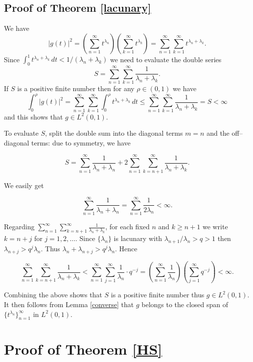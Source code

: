 \documentclass[11pt, a4paper]{article}
\begin{document}
\subsection{Proof of Theorem \ref{lacunary}}



We have
\[
|g(t)|^2=\left(\sum_{n=1}^{\infty} t^{\lambda_n}\right)\left(\sum_{k=1}^{\infty} t^{\lambda_k}\right)=
\sum_{n=1}^{\infty}\sum_{k=1}^{\infty} t^{\lambda_n + \lambda_k}.
\]
Since $\int_{0}^{1} t^{\lambda_n + \lambda_k}\, dt<1/(\lambda_n + \lambda_k)$ we need to evaluate the double series
\[
S=\sum_{n=1}^{\infty}\sum_{k=1}^{\infty}\frac{1}{\lambda_n + \lambda_k}.
\]
If $S$ is a positive finite number then for any $\rho\in (0,1)$ we have
\[
\int_{0}^{\rho}|g(t)|^2=\sum_{n=1}^{\infty}\sum_{k=1}^{\infty}\int_{0}^{\rho}  t^{\lambda_n + \lambda_k} \, dt \le
\sum_{n=1}^{\infty}\sum_{k=1}^{\infty} \frac{1}{\lambda_n + \lambda_k}=S<\infty
\]
and this shows that $g\in L^2 (0,1)$.


To evaluate $S$, split the double sum into the diagonal terms $m=n$ and the off--diagonal terms: due to symmetry, we have

\[
S=\sum_{n=1}^{\infty}\frac{1}{\lambda_n + \lambda_n}
+2\sum_{n=1}^{\infty}\sum_{k=n+1}^{\infty}\frac{1}{\lambda_n + \lambda_k}.
\]

We easily get

\[
\sum_{n=1}^{\infty}\frac{1}{\lambda_n + \lambda_n}
=\sum_{n=1}^{\infty}\frac{1}{2\lambda_n}<\infty.
\]

Regarding $\sum_{n=1}^{\infty}\sum_{k=n+1}^{\infty}\frac{1}{\lambda_n + \lambda_k}$, for each fixed $n$ and $k\ge n+1$ we write $k=n+j$ for $j=1,2,\dots$. Since $\{\lambda_{n}\}$ is lacunary with $\lambda_{n+1}/\lambda_n>q>1$ then $\lambda_{n+j}>q^j\lambda_n$.
Thus $\lambda_n+\lambda_{n+j}>q^j\lambda_n$. Hence


\[
\sum_{n=1}^{\infty}\sum_{k=n+1}^{\infty}\frac{1}{\lambda_n + \lambda_k}
<
\sum_{n=1}^{\infty}\sum_{j=1}^{\infty}
\frac{1}{\lambda_n}\cdot q^{-j}=\left(\sum_{n=1}^{\infty}\frac{1}{\lambda_n}\right)\left(\sum_{j=1}^{\infty}q^{-j}\right)<\infty.
\]

Combining the above shows that $S$ is a positive finite number thus $g\in L^2 (0,1)$.
It then follows from Lemma \ref{converse} that $g$ belongs to the closed span of $\{t^{\lambda_n}\}_{n=1}^{\infty}$ in $L^2 (0,1)$.



\section{Proof of Theorem \ref{HS}}
\setcounter{equation}{0}
\end{document}

